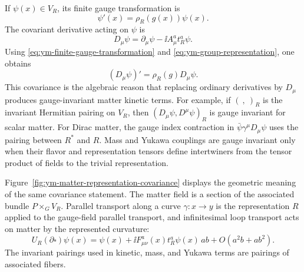 If \(\psi(x)\in V_R\), its finite gauge transformation is
\begin{equation}
  \psi'(x)=\rho_R(g(x))\psi(x).
  \label{eq:ym-matter-finite-transformation}
\end{equation}
The covariant derivative acting on \(\psi\) is
\begin{equation}
  D_\mu\psi
  =
  \partial_\mu\psi-\ii A^a_\mu t_R^a\psi.
  \label{eq:ym-matter-covariant-derivative}
\end{equation}
Using \eqref{eq:ym-finite-gauge-transformation} and
\eqref{eq:ym-group-representation}, one obtains
\begin{equation}
  (D_\mu\psi)'=\rho_R(g)D_\mu\psi.
  \label{eq:ym-matter-covariant-derivative-transform}
\end{equation}
This covariance is the algebraic reason that replacing ordinary derivatives
by \(D_\mu\) produces gauge-invariant matter kinetic terms.
For example, if \((\ ,\ )_R\) is the invariant Hermitian pairing on \(V_R\),
then \((D_\mu\psi,D^\mu\psi)_R\) is gauge invariant for scalar matter.  For
Dirac matter, the gauge index contraction in \(\bar\psi\gamma^\mu D_\mu\psi\)
uses the pairing between \(R^*\) and \(R\).  Mass and Yukawa couplings are
gauge invariant only when their flavor and representation tensors define
intertwiners from the tensor product of fields to the trivial representation.

Figure~\ref{fig:ym-matter-representation-covariance} displays the geometric
meaning of the same covariance statement.  The matter field is a section of
the associated bundle \(P\times_G V_R\).  Parallel transport along a curve
\(\gamma:x\to y\) is the representation \(R\) applied to the gauge-field
parallel transport, and infinitesimal loop transport acts on matter by the
represented curvature:
\[
  U_R(\partial\square)\psi(x)
  =
  \psi(x)+\ii F^a_{\mu\nu}(x)t_R^a\psi(x)\,ab
  +O(a^2b+ab^2).
\]
The invariant pairings used in kinetic, mass, and Yukawa terms are pairings
of associated fibers.

